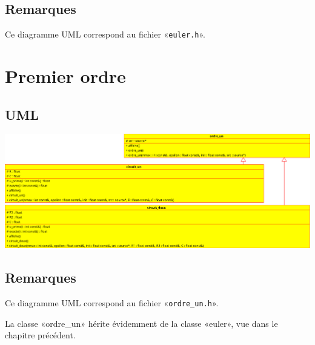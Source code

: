 \documentclass{report}
\begin{document}
    \section{Remarques}
        Ce diagramme UML correspond au fichier «\verb|euler.h|».

\chapter{Premier ordre}
    \begin{multicols}{2}
        \section{UML}
            \includegraphics[width=\linewidth+\linewidth,angle=90]{images/ordre_un}

        \section{Remarques}
            Ce diagramme UML correspond au fichier «\verb|ordre_un.h|».

            La classe «ordre\_un» hérite évidemment de la classe «euler», vue dans le chapitre précédent.
    \end{multicols}
\end{document}
